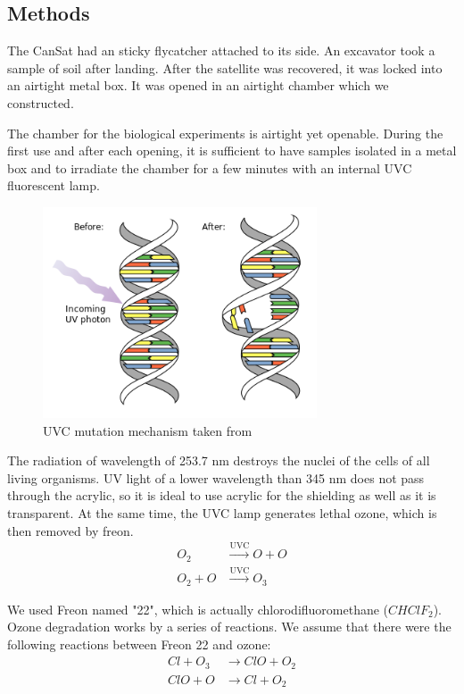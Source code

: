 \documentclass{cfp}
\begin{document}
\subsection{Methods}
\par
The CanSat had an sticky flycatcher attached to its side. An excavator took a sample of soil after landing. After the satellite was recovered, it was locked into an airtight metal box. It was opened in an airtight chamber which we constructed.
\par
The chamber for the biological experiments is airtight yet openable. During the first use and after each opening, it is sufficient to have samples isolated in a metal box and to irradiate the chamber for a few minutes with an internal UVC fluorescent lamp. \cite{Allen}
\begin{figure}[!h]
\centering
\caption{UVC mutation mechanism taken from \cite{Allen}}
\includegraphics[width=230pt]{UVCmutation.png}
\end{figure}
The radiation of wavelength of 253.7 nm destroys the nuclei of the cells of all living organisms. UV light of a lower wavelength than 345 nm does not pass through the acrylic, so it is ideal to use acrylic for the shielding as well as it is transparent. \cite{Eplastics} At the same time, the UVC lamp generates lethal ozone, which is then removed by freon. 
\begin{align}
O_2 &\xrightarrow{\text{UVC}} O + O \\
O_2 + O &\xrightarrow{\text{UVC}} O_3
\end{align}
\par
We used Freon named "22", which is actually chlorodifluoromethane ($CHClF_2$). Ozone degradation works by a series of reactions. We assume that there were the following reactions between Freon 22 and ozone:\\
\begin{align}
Cl + O_3 &\xrightarrow{} ClO + O_2 \\
ClO + O &\xrightarrow{} Cl + O_2
\end{align}
\end{document}

